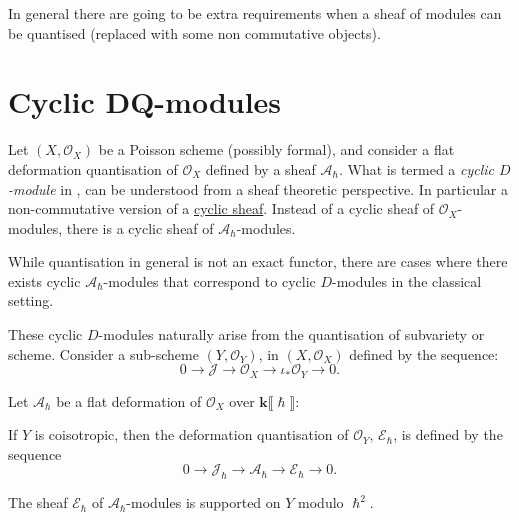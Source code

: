     In general there are going to be extra requirements when a sheaf of modules can be quantised (replaced with some non commutative objects). 


    \section{Cyclic \texorpdfstring{DQ}{DQ}-modules}
    
    
    Let \( (X,\mathcal{O}_X)\) be a Poisson scheme (possibly formal), and consider a flat deformation quantisation of \( \mathcal{O}_X\) defined by a sheaf \( \mathcal{A}_\hslash\). What is termed a \emph{cyclic \( D\)-module} in \cite{ks_airy}, can be understood from a sheaf theoretic perspective. In particular a non-commutative version of a \hyperref[defn:cyclicsheaf]{cyclic sheaf}. Instead of a cyclic sheaf of \( \mathcal{O}_X\)-modules, there is a cyclic sheaf of \( \mathcal{A}_{\hslash}\)-modules.

    
    While quantisation in general is not an exact functor, there are cases where there exists cyclic \( \mathcal{A}_\hslash\)-modules that correspond to cyclic \(D\)-modules in the classical setting.
    
    These cyclic \(D\)-modules naturally arise from the quantisation of subvariety or scheme. Consider a sub-scheme \((Y,\mathcal{O}_Y)\), in \((X, \mathcal{O}_X)\) defined by the sequence:
    \[ 0\rightarrow \mathcal{J} \rightarrow \mathcal{O}_X \rightarrow \iota_*\mathcal{O}_Y \rightarrow 0.\]
    
    Let \( \mathcal{A}_{\hslash}\) be a flat deformation of \( \mathcal{O}_X\) over \( \mathbf{k}\lBrack \hslash \rBrack\):
    \begin{prop} 
    If \(Y\) is coisotropic, then the deformation quantisation of \(\mathcal{O}_Y\), \( \mathcal{E}_{\hslash}\), is defined by the sequence
    \[ 0 \rightarrow \mathcal{J}_\hslash  \rightarrow \mathcal{A}_\hslash  \rightarrow \mathcal{E}_\hslash \rightarrow 0.\]
    \end{prop}
    
    \begin{lem} 
    The sheaf \( \mathcal{E}_{\hslash}\) of \( \mathcal{A}_\hslash\)-modules is supported on \( Y\) modulo \(\hslash^2\). 
    \end{lem} 
    
